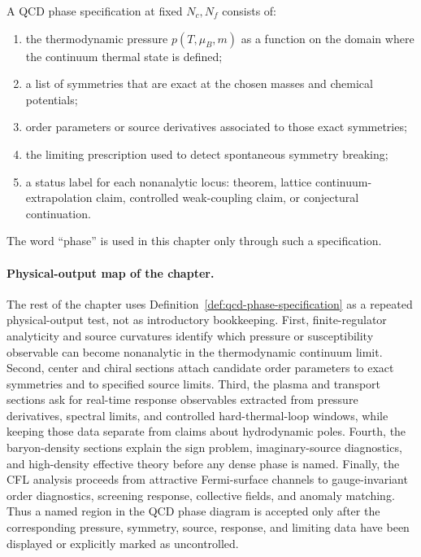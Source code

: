 \begin{definition}
\label{def:qcd-phase-specification}
A QCD phase specification at fixed \(N_c,N_f\) consists of:
\begin{enumerate}
  \item the thermodynamic pressure \(p(T,\mu_B,m)\) as a function on the
  domain where the continuum thermal state is defined;
  \item a list of symmetries that are exact at the chosen masses and chemical
  potentials;
  \item order parameters or source derivatives associated to those exact
  symmetries;
  \item the limiting prescription used to detect spontaneous symmetry
  breaking;
  \item a status label for each nonanalytic locus: theorem, lattice
  continuum-extrapolation claim, controlled weak-coupling claim, or
  conjectural continuation.
\end{enumerate}
The word ``phase'' is used in this chapter only through such a specification.
\end{definition}

\paragraph{Physical-output map of the chapter.}
The rest of the chapter uses Definition~\ref{def:qcd-phase-specification} as
a repeated physical-output test, not as introductory bookkeeping.  First,
finite-regulator analyticity and source curvatures identify which pressure
or susceptibility observable can become nonanalytic in the thermodynamic
continuum limit.  Second, center and chiral sections attach candidate order
parameters to exact symmetries and to specified source limits.  Third, the
plasma and transport sections ask for real-time response observables extracted
from pressure derivatives, spectral limits, and controlled hard-thermal-loop
windows, while keeping those data separate from claims about hydrodynamic
poles.  Fourth, the baryon-density sections explain the sign problem,
imaginary-source diagnostics, and high-density effective theory before any
dense phase is named.  Finally, the CFL analysis proceeds from attractive
Fermi-surface channels to gauge-invariant order diagnostics, screening
response, collective fields, and anomaly matching.  Thus a named region in the
QCD phase diagram is accepted only after the corresponding pressure,
symmetry, source, response, and limiting data have been displayed or
explicitly marked as uncontrolled.

